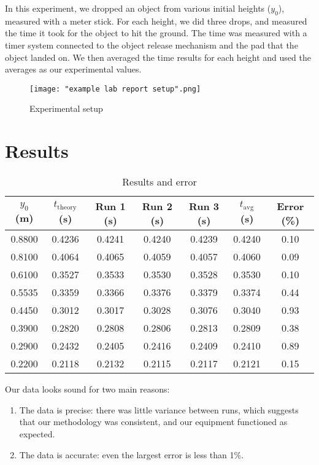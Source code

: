 \documentclass{article}
\begin{document}
In this experiment, we dropped an object from various initial heights ($y_0$), measured with a meter stick. For each height, we did three drops, and measured the time it took for the object to hit the ground. The time was measured with a timer system connected to the object release mechanism and the pad that the object landed on. We then averaged the time results for each height and used the averages as our experimental values.
\begin{figure}[H]
\centering
\texttt{[image: "example lab report setup".png]}
\caption{Experimental setup}
\end{figure}

\section{Results}

\begin{table}[H]
    \centering
    \begin{tabular}{ccccccc}
        \toprule
        $y_0$ (m) & $t_\text{theory}$ (s) & Run 1 (s) & Run 2 (s) & Run 3 (s) & $t_\text{avg}$ (s) & Error (\%) \\
        \midrule        
        0.8800 & 0.4236 & 0.4241 & 0.4240 & 0.4239 & 0.4240 & 0.10 \\
        0.8100 & 0.4064 & 0.4065 & 0.4059 & 0.4057 & 0.4060 & 0.09 \\
        0.6100 & 0.3527 & 0.3533 & 0.3530 & 0.3528 & 0.3530 & 0.10 \\
        0.5535 & 0.3359 & 0.3366 & 0.3376 & 0.3379 & 0.3374 & 0.44 \\
        0.4450 & 0.3012 & 0.3017 & 0.3028 & 0.3076 & 0.3040 & 0.93 \\
        0.3900 & 0.2820 & 0.2808 & 0.2806 & 0.2813 & 0.2809 & 0.38 \\
        0.2900 & 0.2432 & 0.2405 & 0.2416 & 0.2409 & 0.2410 & 0.89 \\
        0.2200 & 0.2118 & 0.2132 & 0.2115 & 0.2117 & 0.2121 & 0.15 \\
        \bottomrule
    \end{tabular}
    \caption{Results and error}
\end{table}

Our data looks sound for two main reasons:
\begin{enumerate}[1.]
    \item The data is precise: there was little variance between runs, which suggests that our methodology was consistent, and our equipment functioned as expected.
    \item The data is accurate: even the largest error is less than 1\%.
\end{enumerate}
\end{document}
